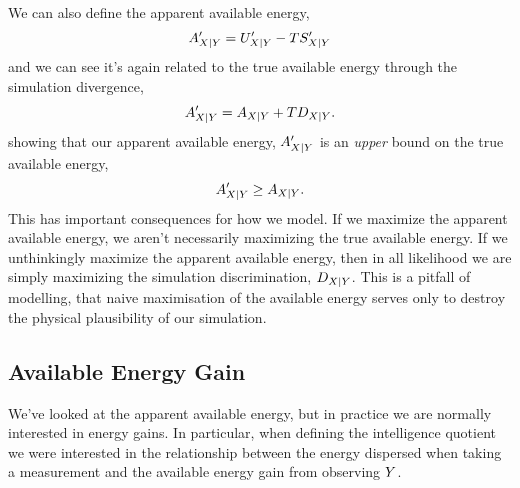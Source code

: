 \documentclass[]{article}
\begin{document}
We can also define the apparent available energy, 
\[
A^\prime_{X|Y} = U^\prime_{X|Y} - TS^\prime_{X|Y}
\] 
and we can see it's again related to the true available energy through the
simulation divergence, 
\[
A^\prime_{X|Y} = A_{X|Y} + TD_{X|Y}.
\] 
showing that our apparent available energy,
\(A^\prime_{X|Y}\) is an \emph{upper} bound
on the true available energy, 
\[
A^\prime_{X|Y} \geq A_{X|Y}.
\]
This has important consequences for how we model. If we maximize the
apparent available energy, we aren't necessarily maximizing the true
available energy. If we unthinkingly maximize the apparent available energy, then in all likelihood we are simply maximizing the simulation discrimination, $D_{X | Y}$. This is a pitfall of modelling, that naive maximisation of the available energy serves only to destroy the physical plausibility of our simulation.

\subsection{Available Energy Gain}

We've looked at the apparent available energy, but in practice we are normally interested in energy gains. In particular, when defining the intelligence quotient we were interested in the relationship between the energy dispersed when taking a measurement and the available energy gain from observing $Y$. 
\end{document}
